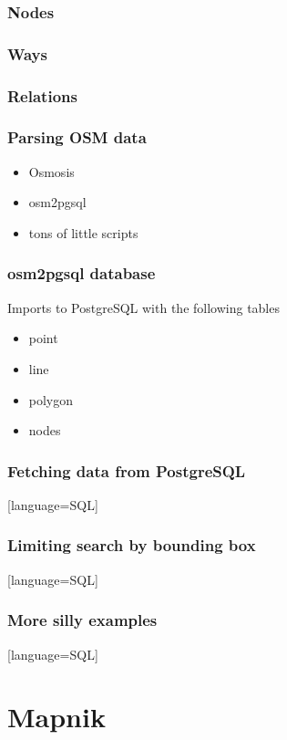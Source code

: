 \documentclass{beamer}
\begin{document}
\begin{frame}
  \frametitle{Nodes}
  
\end{frame}

\begin{frame}
  \frametitle{Ways}
  
\end{frame}

\begin{frame}
  \frametitle{Relations}
  
\end{frame}

\begin{frame}
  \frametitle{Parsing OSM data}
  \begin{itemize}
  \item Osmosis
  \item osm2pgsql
  \item tons of little scripts
  \end{itemize}
\end{frame}

\begin{frame}
  \frametitle{osm2pgsql database}
  Imports to PostgreSQL with the following tables
  \begin{itemize}
  \item point
  \item line
  \item polygon
  \item nodes
  \end{itemize}
\end{frame}

\begin{frame}
  \frametitle{Fetching data from PostgreSQL}
  [language=SQL]
\end{frame}

\begin{frame}
  \frametitle{Limiting search by bounding box}
  [language=SQL]
\end{frame}

\begin{frame}
  \frametitle{More silly examples}
  [language=SQL]
\end{frame}

\section{Mapnik}
\end{document}
